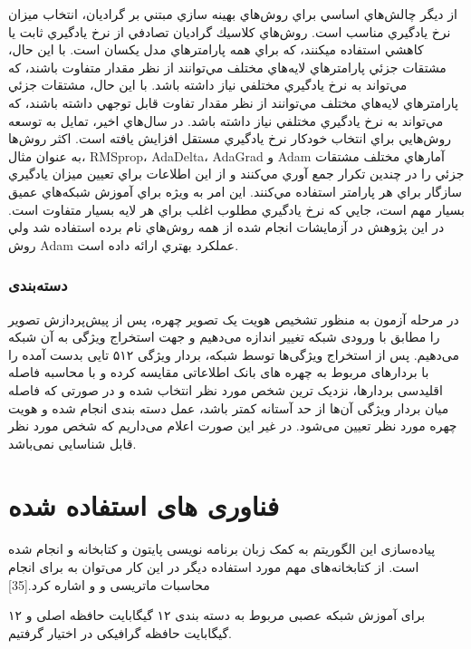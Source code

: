 \noindent
از ديگر چالش‌هاي اساسي براي روش‌هاي بهينه سازي مبتني بر گراديان، انتخاب ميزان نرخ يادگيري مناسب است. روش‌هاي كلاسيك گراديان تصادفي از نرخ يادگيري ثابت يا كاهشي استفاده ميكنند، كه براي همه پارامترهاي مدل يكسان است. با اين حال، مشتقات جزئي پارامترهاي لايه‌هاي مختلف مي‌توانند از نظر مقدار متفاوت باشند، كه مي‌تواند به نرخ يادگيري مختلفي نياز داشته باشد. با اين حال، مشتقات جزئي پارامترهاي لايه‌هاي مختلف مي‌توانند از نظر مقدار تفاوت قابل توجهي داشته باشند، كه مي‌تواند به نرخ يادگيري مختلفي نياز داشته باشد. در سال‌هاي اخير، تمايل به توسعه روش‌هايي براي انتخاب خودكار نرخ يادگيري مستقل افزايش يافته است. اكثر روش‌ها به عنوان مثال، RMSprop، AdaDelta، AdaGrad و Adam آمارهاي مختلف مشتقات جزئي را در چندين تكرار جمع آوري مي‌كنند و از اين اطلاعات براي تعيين ميزان يادگيري سازگار براي هر پارامتر استفاده مي‌كنند. اين امر به ويژه براي آموزش شبكه‌هاي عميق بسيار مهم است، جايي كه نرخ يادگيري مطلوب اغلب براي هر لايه بسيار متفاوت است. در اين پژوهش در آزمايشات انجام شده از همه روش‌هاي نام برده استفاده شد ولي روش Adam عملكرد بهتري ارائه داده است.

\subsubsection{دسته‌بندی}
در مرحله آزمون به منظور تشخیص هویت یک تصویر چهره، پس از پیش‌پردازش تصویر را مطابق با ورودی شبکه تغییر اندازه می‌دهیم و جهت استخراج ویژگی‌ به آن شبکه می‌دهیم. پس از استخراج ویژگی‌ها توسط شبکه، بردار ویژگی ۵۱۲ تایی بدست آمده را با بردارهای مربوط به چهره های بانک اطلاعاتی مقایسه کرده و با محاسبه فاصله اقلیدسی بردارها، نزدیک ترین شخص مورد نظر انتخاب شده و در صورتی که فاصله میان بردار ویژگی آن‌ها از حد آستانه کمتر باشد، عمل دسته بندی انجام شده و هویت چهره مورد نظر تعیین می‌شود. در غیر این صورت اعلام می‌داریم که شخص مورد نظر قابل شناسایی نمی‌باشد.

\section{فناوری های استفاده شده}
پیاده‌سازی این الگوریتم به کمک زبان برنامه‌ نویسی پایتون و کتابخانه  و انجام شده است. از کتابخانه‌های مهم مورد استفاده دیگر در این کار می‌‌توان به  برای انجام محاسبات ماتریسی و  و  اشاره کرد.[35] 

برای آموزش شبکه عصبی مربوط به دسته بندی ۱۲ گیگابایت حافظه اصلی و ۱۲ گیگابایت حافظه گرافیکی در اختیار گرفتیم.
